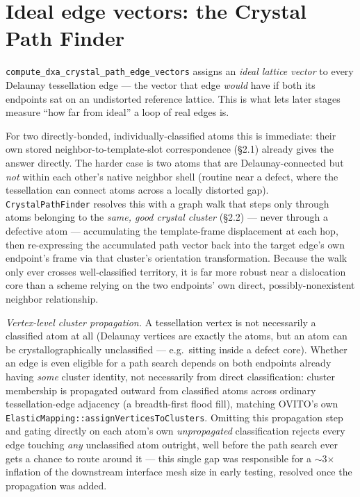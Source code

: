\documentclass[11pt,a4paper]{article}
\newcommand{\op}[1]{\texttt{#1}}
\newcommand{\code}[1]{\texttt{#1}}
\begin{document}
\section{Ideal edge vectors: the Crystal Path Finder}

\op{compute\_dxa\_crystal\_path\_edge\_vectors} assigns an \emph{ideal lattice vector} to every
Delaunay tessellation edge — the vector that edge \emph{would} have if both its endpoints sat on an
undistorted reference lattice. This is what lets later stages measure ``how far from ideal'' a loop
of real edges is.

For two directly-bonded, individually-classified atoms this is immediate: their own stored
neighbor-to-template-slot correspondence (\S 2.1) already gives the answer directly. The harder
case is two atoms that are Delaunay-connected but \emph{not} within each other's native neighbor
shell (routine near a defect, where the tessellation can connect atoms across a locally distorted
gap). \code{CrystalPathFinder} \cite{stukowski2012} resolves this with a graph walk that steps only
through atoms belonging to the \emph{same, good crystal cluster} (\S 2.2) — never through a
defective atom — accumulating the template-frame displacement at each hop, then re-expressing the
accumulated path vector back into the target edge's own endpoint's frame via that cluster's
orientation transformation. Because the walk only ever crosses well-classified territory, it is
far more robust near a dislocation core than a scheme relying on the two endpoints' own direct,
possibly-nonexistent neighbor relationship.

\emph{Vertex-level cluster propagation.} A tessellation vertex is not necessarily a classified atom
at all (Delaunay vertices are exactly the atoms, but an atom can be crystallographically
unclassified — e.g.\ sitting inside a defect core). Whether an edge is even eligible for a path
search depends on both endpoints already having \emph{some} cluster identity, not necessarily from
direct classification: cluster membership is propagated outward from classified atoms across
ordinary tessellation-edge adjacency (a breadth-first flood fill), matching OVITO's own
\code{ElasticMapping::assignVerticesToClusters}. Omitting this propagation step and gating directly
on each atom's own \emph{unpropagated} classification rejects every edge touching \emph{any}
unclassified atom outright, well before the path search ever gets a chance to route around it —
this single gap was responsible for a $\sim$3$\times$ inflation of the downstream interface mesh
size in early testing, resolved once the propagation was added.
\end{document}
